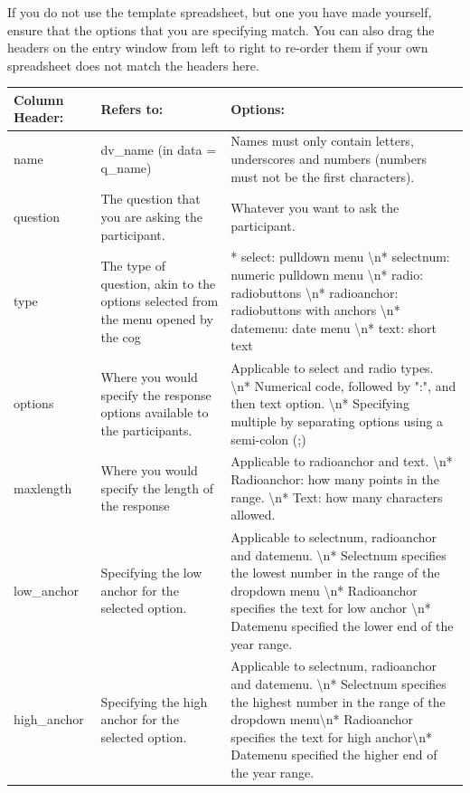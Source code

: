 \documentclass[]{book}
\begin{document}
If you do not use the template spreadsheet, but one you have made yourself, ensure that the options that you are specifying match. You can also drag the headers on the entry window from left to right to re-order them if your own spreadsheet does not match the headers here.

\begin{tabular}{l|l|l}
\hline
Column Header: & Refers to: & Options:\\
\hline
name & dv\_name (in data = q\_name) & Names must only contain letters, underscores and numbers (numbers must not be the first characters).\\
\hline
question & The question that you are asking the participant. & Whatever you want to ask the participant.\\
\hline
type & The type of question, akin to the options selected from the menu opened by the cog & * select: pulldown menu \textbackslash{}n* selectnum: numeric pulldown menu \textbackslash{}n* radio: radiobuttons \textbackslash{}n* radioanchor: radiobuttons with anchors \textbackslash{}n* datemenu: date menu \textbackslash{}n* text: short text\\
\hline
options & Where you would specify the response options available to the participants. & Applicable to select and radio types. \textbackslash{}n*  Numerical code, followed by ":", and then text option. \textbackslash{}n*  Specifying multiple by separating options using a semi-colon (;)\\
\hline
maxlength & Where you would specify the length of the response & Applicable to radioanchor and text. \textbackslash{}n*  Radioanchor: how many points in the range. \textbackslash{}n*  Text: how many characters allowed.\\
\hline
low\_anchor & Specifying the low anchor for the selected option. & Applicable to selectnum, radioanchor and datemenu. \textbackslash{}n*  Selectnum specifies the lowest number in the range of the dropdown menu \textbackslash{}n*  Radioanchor specifies the text for low anchor \textbackslash{}n*  Datemenu specified the lower end of the year range.\\
\hline
high\_anchor & Specifying the high anchor for the selected option. & Applicable to selectnum, radioanchor and datemenu. \textbackslash{}n*  Selectnum specifies the highest number in the range of the dropdown menu\textbackslash{}n*  Radioanchor specifies the text for high anchor\textbackslash{}n*  Datemenu specified the higher end of the year range.\\
\hline
\end{tabular}
\end{document}
